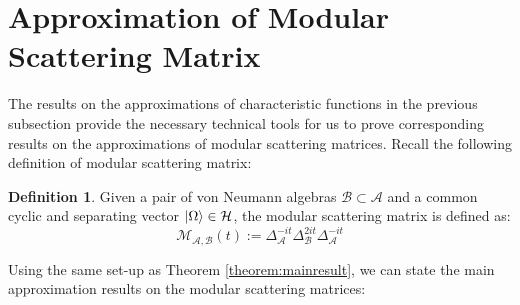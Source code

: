 \documentclass[a4paper,11pt]{article}
\theoremstyle{definition}
\newtheorem{definition}{Definition}[section]
\begin{document}
\section{Approximation of Modular Scattering Matrix}\label{app:modularSmatrix}

The results on the approximations of characteristic functions in the previous subsection provide the necessary technical tools for us to prove corresponding results on the approximations of modular scattering matrices. Recall the following definition of modular scattering matrix:
\begin{definition}
    Given a pair of von Neumann algebras $\mathcal{B}\subset\mathcal{A}$ and a common cyclic and separating vector $\ket{\Omega}\in\mathcal{H}$, the modular scattering matrix is defined as:
    \begin{equation}
        \mathcal{M}_{\mathcal{A},\mathcal{B}}(t):=\Delta_\mathcal{A}^{-it}\Delta_\mathcal{B}^{2it}\Delta_\mathcal{A}^{-it}
    \end{equation}
\end{definition}
Using the same set-up as Theorem \ref{theorem:mainresult}, we can state the main approximation results on the modular scattering matrices:
\end{document}
